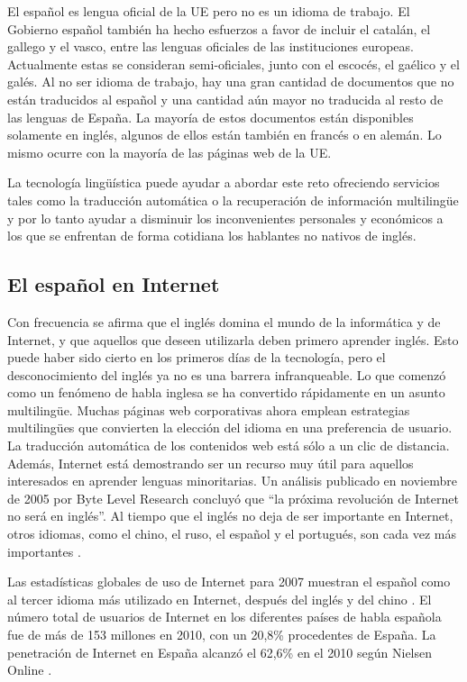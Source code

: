 \begin{multicols}{2}
El español es lengua oficial de la UE pero no es un idioma de trabajo. El Gobierno español también ha hecho esfuerzos a favor de incluir el catalán, el gallego y el vasco, entre las lenguas oficiales de las instituciones europeas. Actualmente estas se consideran semi-oficiales, junto con el escocés, el gaélico y el galés. Al no ser idioma de trabajo, hay una gran cantidad de documentos que no están traducidos al español y una cantidad aún mayor no traducida al resto de las lenguas de España. La mayoría de estos documentos están disponibles solamente en inglés, algunos de ellos están también en francés o en alemán. Lo mismo ocurre con la mayoría de las páginas web de la UE.

La tecnología lingüística puede ayudar a abordar este reto ofreciendo servicios tales como la traducción automática o la recuperación de información multilingüe y por lo tanto ayudar a disminuir los inconvenientes personales y económicos a los que se enfrentan de forma cotidiana los hablantes no nativos de inglés.

\subsection{El español en Internet}

Con frecuencia se afirma que el inglés domina el mundo de la informática y de Internet, y que aquellos que deseen utilizarla deben primero aprender inglés. Esto puede haber sido cierto en los primeros días de la tecnología, pero el desconocimiento del inglés ya no es una barrera infranqueable. Lo que comenzó como un fenómeno de habla inglesa se ha convertido rápidamente en un asunto multilingüe. Muchas páginas web corporativas ahora emplean estrategias multilingües que convierten la elección del idioma en una preferencia de usuario. La traducción automática de los contenidos web está sólo a un clic de distancia. Además, Internet está demostrando ser un recurso muy útil para aquellos interesados en aprender lenguas minoritarias. Un análisis publicado en noviembre de 2005 por Byte Level Research concluyó que ``la próxima revolución de Internet no será en inglés''. Al tiempo que el inglés no deja de ser  importante en Internet, otros idiomas, como el chino, el ruso, el español y el portugués, son cada vez  más importantes \cite{espanolred,britishcouncil}.

Las estadísticas globales de uso de Internet para 2007 muestran el español como al tercer idioma más utilizado en Internet, después del inglés y del chino \cite{internetworldstats}. El número total de usuarios de Internet en los diferentes países de habla española fue de más de 153 millones en 2010, con un 20,8\% procedentes de España. La penetración de Internet en España alcanzó el 62,6\% en el 2010 según Nielsen Online \cite{nielsen}. 


\end{multicols}

